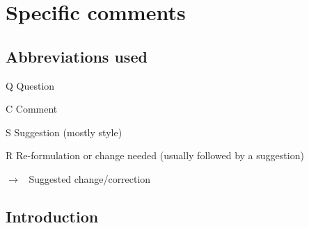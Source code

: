 \documentclass[11pt]{article}
\newenvironment{my_description}
{\begin{description}
  \setlength{\itemsep}{2pt}
  \setlength{\parskip}{0pt}
  \setlength{\parsep}{0pt}}
{\end{description}}
\newcommand{\ra}{$\rightarrow$\ }
\begin{document}
\section{Specific comments}

\subsection{Abbreviations used}
\begin{my_description}
	\item[Q] Question
	\item[C] Comment
	\item[S] Suggestion (mostly style)
	\item[R] Re-formulation or change needed (usually followed by a suggestion)
	\item[\ra] Suggested change/correction
\end{my_description}


%

\subsection{Introduction}
\end{document}
